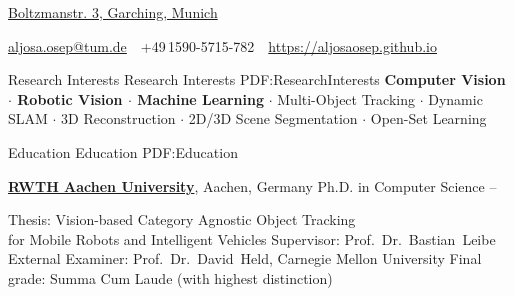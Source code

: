 \documentclass[letterpaper,MMMyyyy,nonstopmode]{simpleresumecv}
\newcommand{\CVAuthor}{Aljoša Ošep}
\newcommand{\CVWebpage}{https://aljosaosep.github.io}
\begin{document}

\Title{\CVAuthor}

\begin{SubTitle}
\href{https://goo.gl/maps/8UN1jSYxTui29HQr5}
{Boltzmanstr. 3, Garching, Munich}
\par
\href{mailto:aljosa.osep@tum.de}
{aljosa.osep@tum.de}
\,\SubBulletSymbol\,
+49\,1590-5715-782
\,\SubBulletSymbol\,
\href{\CVWebpage}
{\url{\CVWebpage}}
\end{SubTitle}

\begin{Body}

\Section
{Research Interests}
{Research Interests}
{PDF:ResearchInterests}
\textbf{Computer Vision  $\cdot$ Robotic Vision  $\cdot$  Machine Learning} $\cdot$
Multi-Object Tracking $\cdot$ Dynamic SLAM $\cdot$ 3D Reconstruction $\cdot$ 2D/3D Scene Segmentation $\cdot$ Open-Set Learning 


\Section
{Education}
{Education}
{PDF:Education}


\Entry
\href{http://www.rwth-aachen.de}
{\textbf{RWTH Aachen University}},
Aachen, Germany
\Gap
\BulletItem
Ph.D. in Computer Science
\hfill
{} -- 
\begin{Detail}
\SubBulletItem
Thesis:
{Vision-based Category Agnostic Object Tracking \\for Mobile Robots and Intelligent Vehicles}
\SubBulletItem
Supervisor:
Prof.~Dr.~Bastian~Leibe
\SubBulletItem
External Examiner:
Prof.~Dr.~David~Held, Carnegie Mellon University
\SubBulletItem
Final grade: Summa Cum Laude (with highest distinction)
\end{Detail}
%


\end{Body}
\end{document}
